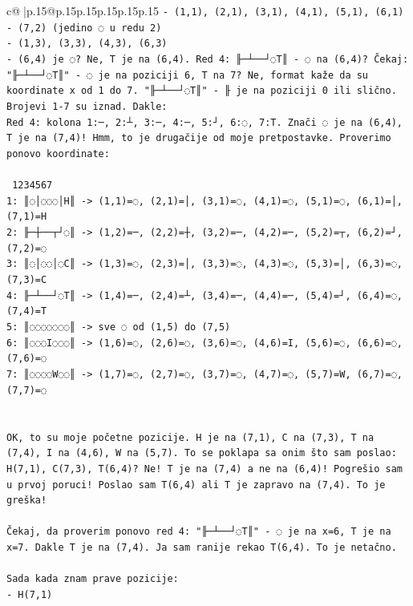 \documentclass{article}
\begin{document}
{\begin{supertabular}{c@{$\;$}|p{.15\linewidth}@{}p{.15\linewidth}p{.15\linewidth}p{.15\linewidth}p{.15\linewidth}p{.15\linewidth}}
{{{\texttt{{-} (1,1), (2,1), (3,1), (4,1), (5,1), (6,1)} \\
\texttt{{-} (7,2) (jedino ◌ u redu 2)} \\
\texttt{{-} (1,3), (3,3), (4,3), (6,3)} \\
\texttt{{-} (6,4) je ◌? Ne, T je na (6,4). Red 4: ╟─┴──┘◌T║ {-} ◌ na (6,4)? Čekaj: "╟─┴──┘◌T║" {-} ◌ je na poziciji 6, T na 7? Ne, format kaže da su koordinate x od 1 do 7. "╟─┴──┘◌T║" {-} ╟ je na poziciji 0 ili slično. Brojevi 1{-}7 su iznad. Dakle:} \\
\texttt{Red 4: kolona 1:─, 2:┴, 3:─, 4:─, 5:┘, 6:◌, 7:T. Znači ◌ je na (6,4), T je na (7,4)! Hmm, to je drugačije od moje pretpostavke. Proverimo ponovo koordinate:} \\
\\ 
\texttt{ 1234567} \\
\texttt{1: ║◌│◌◌◌│H║  {-}> (1,1)=◌, (2,1)=│, (3,1)=◌, (4,1)=◌, (5,1)=◌, (6,1)=│, (7,1)=H} \\
\texttt{2: ╟─┼──┬┘◌║  {-}> (1,2)=─, (2,2)=┼, (3,2)=─, (4,2)=─, (5,2)=┬, (6,2)=┘, (7,2)=◌} \\
\texttt{3: ║◌│◌◌│◌C║  {-}> (1,3)=◌, (2,3)=│, (3,3)=◌, (4,3)=◌, (5,3)=│, (6,3)=◌, (7,3)=C} \\
\texttt{4: ╟─┴──┘◌T║  {-}> (1,4)=─, (2,4)=┴, (3,4)=─, (4,4)=─, (5,4)=┘, (6,4)=◌, (7,4)=T} \\
\texttt{5: ║◌◌◌◌◌◌◌║  {-}> sve ◌ od (1,5) do (7,5)} \\
\texttt{6: ║◌◌◌I◌◌◌║  {-}> (1,6)=◌, (2,6)=◌, (3,6)=◌, (4,6)=I, (5,6)=◌, (6,6)=◌, (7,6)=◌} \\
\texttt{7: ║◌◌◌◌W◌◌║  {-}> (1,7)=◌, (2,7)=◌, (3,7)=◌, (4,7)=◌, (5,7)=W, (6,7)=◌, (7,7)=◌} \\
\\ 
\\ 
\texttt{OK, to su moje početne pozicije. H je na (7,1), C na (7,3), T na (7,4), I na (4,6), W na (5,7). To se poklapa sa onim što sam poslao: H(7,1), C(7,3), T(6,4)? Ne! T je na (7,4) a ne na (6,4)! Pogrešio sam u prvoj poruci! Poslao sam T(6,4) ali T je zapravo na (7,4). To je greška!} \\
\\ 
\texttt{Čekaj, da proverim ponovo red 4: "╟─┴──┘◌T║" {-} ◌ je na x=6, T je na x=7. Dakle T je na (7,4). Ja sam ranije rekao T(6,4). To je netačno.} \\
\\ 
\texttt{Sada kada znam prave pozicije:} \\
\texttt{{-} H(7,1)} \\
}}}
\end{supertabular}}
\end{document}

